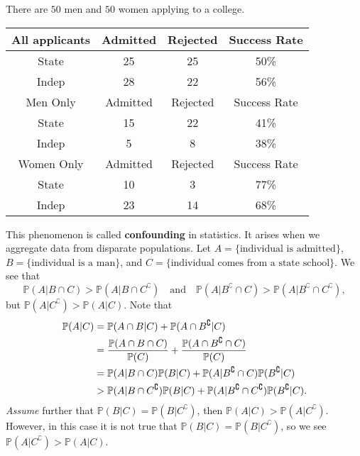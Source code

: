 \begin{example}
    There are $50$ men and $50$ women applying to a college.
    \begin{center}
        \begin{tabular}{|c|c|c|c|}
            \hline
            All applicants&Admitted&Rejected&Success Rate\\
            \hline
            State&25&25&50\%\\
            Indep&28&22&56\%\\
            \hline
            Men Only&Admitted&Rejected&Success Rate\\
            \hline
            State&15&22&41\%\\
            Indep&5&8&38\%\\
            \hline
            Women Only&Admitted&Rejected&Success Rate\\
            \hline
            State&10&3&77\%\\
            Indep&23&14&68\%\\ 
            \hline
        \end{tabular}
    \end{center}
    This phenomenon is called \textbf{confounding} in statistics. It arises when we aggregate data from disparate populations. Let $ A = \{\text{individual is admitted}\} $, $ B = \{\text{individual is a man}\} $, and $ C = \{\text{individual comes from a state school}\} $. We see that 
    \[
        \mathbb{P}(A|B \cap C)>\mathbb{P}(A|B \cap C^\complement)\quad \text{and}\quad \mathbb{P}(A|B^\complement \cap C)> \mathbb{P}(A| B^\complement \cap C^\complement),
    \]
    but $ \mathbb{P}(A|C^\complement)>\mathbb{P}(A|C) $. Note that
    \begin{align*}
        \mathbb{P}(A|C) &= \mathbb{P}(A \cap B|C)+\mathbb{P}(A \cap B^\complement|C)\\ 
        &= \frac{{\mathbb{P}}(A\cap B\cap C)}{{\mathbb{P}}(C)}+\frac{{\mathbb{P}}(A\cap B^\complement\cap C)}{{\mathbb{P}}(C)}\\ 
        &= \mathbb{P}(A|B\cap C)\mathbb{P}(B|C)+\mathbb{P}(A|B^\complement \cap C)\mathbb{P}(B^\complement|C)\\ 
        &> \mathbb{P}(A|B\cap C^\complement)\mathbb{P}(B|C)+\mathbb{P}(A|B^\complement \cap C^\complement)\mathbb{P}(B^\complement|C).
    \end{align*}
    \textit{Assume} further that $ \mathbb{P}(B|C) = \mathbb{P}(B|C^\complement) $, then $ \mathbb{P}(A|C)>\mathbb{P}(A|C^\complement) $. However, in this case it is not true that $ \mathbb{P}(B|C) = \mathbb{P}(B|C^\complement) $, so we see $ \mathbb{P}(A|C^\complement)>\mathbb{P}(A|C) $.
\end{example}

